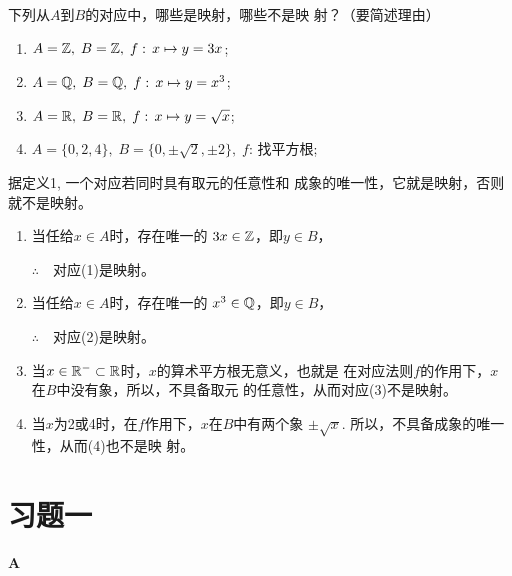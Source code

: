 \begin{example}
    下列从$A$到$B$的对应中，哪些是映射，哪些不是映
射？（要简述理由）
\begin{enumerate}[(1)]
    \item $A=\mathbb{Z},\; B=\mathbb{Z},\; f:\, x\mapsto  y=3x$;
    \item $A=\mathbb{Q},\; B=\mathbb{Q},\; f:\, x\mapsto  y=x^3$;
    \item $A=\mathbb{R},\; B=\mathbb{R},\; f:\, x\mapsto  y=\sqrt{x}$;
    \item $A=\{0,2,4\},\; B=\{0,\pm\sqrt{2},\pm 2\},\; f:\, \text{找平方根}$;
\end{enumerate}
\end{example}

\begin{analyze}
    据定义1, 一个对应若同时具有取元的任意性和
成象的唯一性，它就是映射，否则就不是映射。
\end{analyze}

\begin{solution}
\begin{enumerate}[(1)]
    \item 当任给$x\in A$时，存在唯一的
$3x\in\mathbb{Z}$，即$y\in B$，

$\therefore\quad $对应(1)是映射。

\item 当任给$x\in A$时，存在唯一的
$x^3\in\mathbb{Q}$，即$y\in B$，

$\therefore\quad $对应(2)是映射。
\item 当$x\in\mathbb{R}^-\subset \mathbb{R}$时，$x$的算术平方根无意义，也就是
在对应法则$f$的作用下，$x$在$B$中没有象，所以，不具备取元
的任意性，从而对应(3)不是映射。
\item 当$x$为2或4时，在$f$作用下，$x$在$B$中有两个象
$\pm\sqrt{x}$. 所以，不具备成象的唯一性，从而(4)也不是映
射。
\end{enumerate}
\end{solution}

\section*{习题一}
\begin{center}
    \bfseries A
\end{center}


